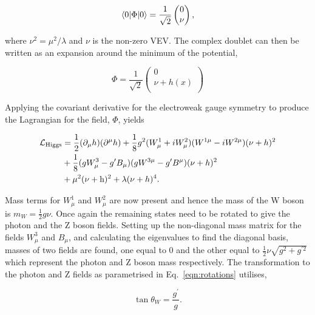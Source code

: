\begin{equation}
\braket{0|\Phi|0} = \frac{1}{\sqrt{2}}
	\begin{pmatrix} 
		0 \\
		\nu \\
	\end{pmatrix},
\end{equation}

where $\nu^2 = \mu^2 / \lambda$ and $\nu$ is the non-zero \ac{VEV}.
The complex doublet can then be written as an expansion around the minimum of the potential,

\begin{equation}
\Phi = \frac{1}{\sqrt{2}}
	\begin{pmatrix} 
		0 \\
		\nu + h(x)\\
	\end{pmatrix}
\end{equation}

Applying the covariant derivative for the electroweak gauge symmetry to produce the Lagrangian for the field, $\Phi$, yields

\begin{align}
\begin{split}
\mathcal{L}_{\text{Higgs}} &= \frac{1}{2}(\partial_{\mu}h)(\partial^{\mu}h) + \frac{1}{8} g^{2} (W_{\mu}^{1} + i W_{\mu}^{2})(W^{1\mu} - i W^{2\mu})(\nu + h)^2 \\
&+ \frac{1}{8} (g W_{\mu}^{3} - g' B_{\mu})(g W^{3\mu} - g' B^{\mu})(\nu + h)^2  \\
&+ \mu^2 (\nu + {\text{h}})^2 + \lambda (\nu + h)^4.
\end{split}
\end{align}

Mass terms for $W_{\mu}^{1}$ and $W_{\mu}^{2}$ are now present and hence the mass of the W boson is $m_W = \frac{1}{2}g\nu$.
Once again the remaining states need to be rotated to give the photon and the Z boson fields.
Setting up the non-diagonal mass matrix for the fields $W_{\mu}^{3}$ and $B_{\mu}$, and calculating the eigenvalues to find the diagonal basis, masses of two fields are found, one equal to 0 and the other equal to $\frac{1}{2} \nu \sqrt{g^2 + g^{\prime 2}}$ which represent the photon and Z boson mass respectively.
The transformation to the photon and Z fields as parametrised in Eq.~\ref{eqn:rotations} utilises,

\begin{equation}
\tan\theta_W = \frac{g^{\prime}}{g}.
\end{equation}

